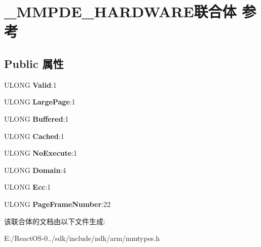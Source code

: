 \hypertarget{union___m_m_p_d_e___h_a_r_d_w_a_r_e}{}\section{\+\_\+\+M\+M\+P\+D\+E\+\_\+\+H\+A\+R\+D\+W\+A\+R\+E联合体 参考}
\label{union___m_m_p_d_e___h_a_r_d_w_a_r_e}
\subsection*{Public 属性}
\begin{DoxyCompactItemize}
\item 
\mbox{\label{union___m_m_p_d_e___h_a_r_d_w_a_r_e_a393a18e033e9e6018ccfdbf72edea274}} 
U\+L\+O\+NG {\bfseries Valid}\+:1
\item 
\mbox{\label{union___m_m_p_d_e___h_a_r_d_w_a_r_e_ad37641c7a83d364c8a718000260731f9}} 
U\+L\+O\+NG {\bfseries Large\+Page}\+:1
\item 
\mbox{\label{union___m_m_p_d_e___h_a_r_d_w_a_r_e_aebd313a6e918b6baa5885e58ccb9cf6c}} 
U\+L\+O\+NG {\bfseries Buffered}\+:1
\item 
\mbox{\label{union___m_m_p_d_e___h_a_r_d_w_a_r_e_a435338ad5d8ef4e793145271a0606b55}} 
U\+L\+O\+NG {\bfseries Cached}\+:1
\item 
\mbox{\label{union___m_m_p_d_e___h_a_r_d_w_a_r_e_aa69b865305fbdafabaa02375c0907d12}} 
U\+L\+O\+NG {\bfseries No\+Execute}\+:1
\item 
\mbox{\label{union___m_m_p_d_e___h_a_r_d_w_a_r_e_a33ab83a62af86683460c8ec907274890}} 
U\+L\+O\+NG {\bfseries Domain}\+:4
\item 
\mbox{\label{union___m_m_p_d_e___h_a_r_d_w_a_r_e_a0430e0888bbcae741777f64f7132fb4a}} 
U\+L\+O\+NG {\bfseries Ecc}\+:1
\item 
\mbox{\label{union___m_m_p_d_e___h_a_r_d_w_a_r_e_a1362a9af75e897437d227f16ef6c1bec}} 
U\+L\+O\+NG {\bfseries Page\+Frame\+Number}\+:22
\end{DoxyCompactItemize}


该联合体的文档由以下文件生成\+:\begin{DoxyCompactItemize}
\item 
E\+:/\+React\+O\+S-\/0../sdk/include/ndk/arm/mmtypes.\+h\end{DoxyCompactItemize}
